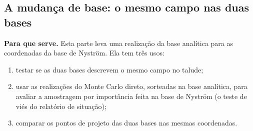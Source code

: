 \documentclass[11pt,a4paper]{article}
\begin{document}
\subsection{A mudança de base: o mesmo campo nas duas bases}\label{sec:mudanca}
\textbf{Para que serve.} Esta parte leva uma realização da base analítica para as coordenadas da base de Nyström. Ela
tem três usos:
\begin{enumerate}
  \item testar se as duas bases descrevem o mesmo campo no talude;
  \item usar as realizações do Monte Carlo direto, sorteadas na base analítica, para avaliar a amostragem por
    importância feita na base de Nyström (o teste de viés do relatório de situação);
  \item comparar os pontos de projeto das duas bases nas mesmas coordenadas.
\end{enumerate}
\end{document}
